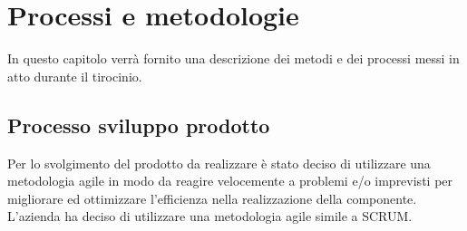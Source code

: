 
\chapter{Processi e metodologie}
\label{cap:processi-metodologie}

In questo capitolo verrà fornito una descrizione dei metodi e dei processi messi in atto durante il tirocinio.

\section{Processo sviluppo prodotto}
Per lo svolgimento del prodotto da realizzare è stato deciso di utilizzare una metodologia agile in modo da reagire velocemente a problemi e/o imprevisti per migliorare ed ottimizzare l'efficienza nella realizzazione della componente. L'azienda ha deciso di utilizzare una metodologia agile simile a SCRUM.
